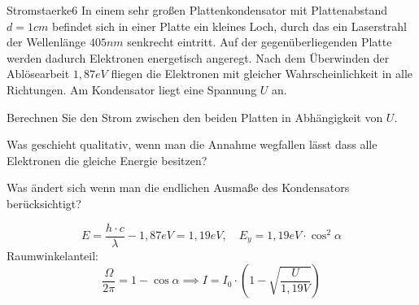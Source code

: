 \begin{problem}{Stromstaerke}{6}
In einem sehr großen Plattenkondensator mit Plattenabstand $d=1\unit{cm}$ befindet sich in einer Platte ein kleines Loch, durch das ein Laserstrahl der Wellenlänge $405\unit{nm}$ senkrecht eintritt. Auf der gegenüberliegenden Platte werden dadurch Elektronen energetisch angeregt. Nach dem Überwinden der Ablösearbeit $1,87\unit{eV}$ fliegen die Elektronen mit gleicher Wahrscheinlichkeit in alle Richtungen. Am Kondensator liegt eine Spannung $U$ an.
\begin{abcenum}
  \item Berechnen Sie den Strom zwischen den beiden Platten in Abhängigkeit von $U$.
  \item Was geschieht qualitativ, wenn man die Annahme wegfallen lässt dass alle Elektronen die gleiche Energie besitzen?
  \item Was ändert sich wenn man die endlichen Ausmaße des Kondensators berücksichtigt?
\end{abcenum}
\begin{solution}
\[
E=\frac{h\cdot c}{\lambda}-1,87\unit{eV}=1,19\unit{eV}, \quad E_y=1,19\unit{eV}\cdot \cos^2\alpha
\]
Raumwinkelanteil:
\[
\frac{\Omega}{2\pi} = 1-\cos{\alpha} \implies I=I_0\cdot\left(1-\sqrt{\frac{U}{1,19\unit{V}}}\right)
\]
\end{solution}
\end{problem}


